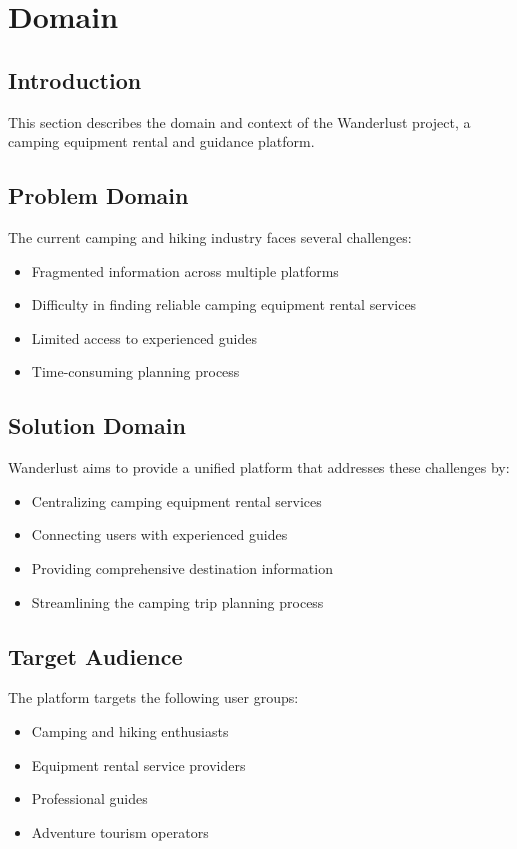\section{Domain}
\subsection{Introduction}
This section describes the domain and context of the Wanderlust project, a camping equipment rental and guidance platform.

\subsection{Problem Domain}
The current camping and hiking industry faces several challenges:
\begin{itemize}
\item Fragmented information across multiple platforms
\item Difficulty in finding reliable camping equipment rental services
\item Limited access to experienced guides
\item Time-consuming planning process
\end{itemize}

\subsection{Solution Domain}
Wanderlust aims to provide a unified platform that addresses these challenges by:
\begin{itemize}
\item Centralizing camping equipment rental services
\item Connecting users with experienced guides
\item Providing comprehensive destination information
\item Streamlining the camping trip planning process
\end{itemize}

\subsection{Target Audience}
The platform targets the following user groups:
\begin{itemize}
\item Camping and hiking enthusiasts
\item Equipment rental service providers
\item Professional guides
\item Adventure tourism operators
\end{itemize}
